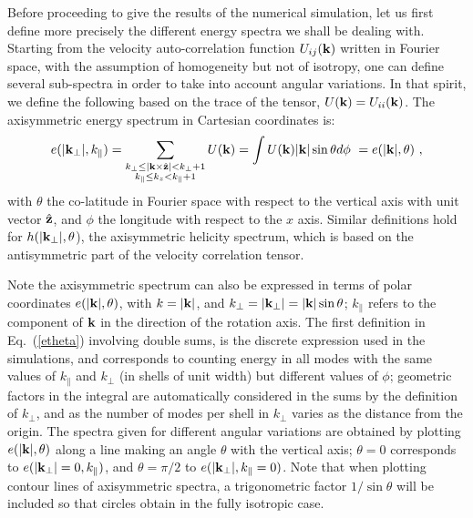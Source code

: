 \documentclass[aps,amsmath,amssymb,floatfix,showpacs]{revtex4}
\begin{document}
Before proceeding to give the results of the numerical simulation, let us first define more precisely the different energy spectra we shall be dealing with. Starting from the velocity auto-correlation function $U_{ij}({\bf k})$ written in Fourier space, with the assumption of homogeneity but not of isotropy, one can define several sub-spectra in order to take into account angular variations. In that spirit, we define the following based on the trace of the tensor, $U({\bf k})=U_{ii}({\bf k})$.
The axisymmetric energy spectrum in Cartesian coordinates is:
\begin{equation}
e(|{\bf k}_{\perp}|,k_{\parallel})=
    \sum_{\substack{
          k_{\perp}\le |{\bf k}\times \hat {\bf z}| < k_{\perp}+1 \\
          k_{\parallel}\le k_z < k_{\parallel}+1}} U({\bf k}) 
    = \int U({\bf k}) |{\bf k}| \sin \theta d \phi \  
    = e(|{\bf k}|, \theta) \ ,
\label{etheta} \end{equation}
with $\theta$ the co-latitude in Fourier space with respect to the vertical axis with unit vector $\hat {\bf z}$, and $\phi$ the longitude with respect to the $x$ axis. Similar definitions hold for $h(|{\bf k}_{\perp}|, \theta$), the axisymmetric helicity spectrum, which is based on the antisymmetric part of the velocity correlation tensor.

Note the axisymmetric spectrum can also be expressed in terms of polar coordinates $e(|{\bf k}|, \theta)$, with $k = |{\bf k}|$, and $k_{\perp}= |{\bf k}_\perp| = |{\bf k}| \sin \theta$; $k_{\parallel}$ refers to the component of ${\bf k}$ in the direction of the rotation axis. The first definition in Eq.~(\ref{etheta}) involving double sums, is the discrete expression used in the simulations, and corresponds to counting energy in all modes with the same values of $k_\parallel$ and $k_{\perp}$ (in shells of unit width) but different values of $\phi$; geometric factors in the integral are automatically considered in the sums by the definition of  $k_{\perp}$, and as the number of modes per shell in $k_{\perp}$ varies as the distance from the origin. The spectra given for different angular variations are obtained by plotting $e(|{\bf k}|, \theta)$ along a line making an angle $\theta$ with the vertical axis; $\theta=0$ corresponds to $e(|{\bf k}_{\perp}|=0,k_{\parallel})$, and $\theta=\pi/2$ to $e(|{\bf k}_{\perp}|,k_{\parallel}=0)$. Note that when plotting contour lines of axisymmetric spectra, a trigonometric factor $1/\sin \theta$ will be included so that circles obtain in the fully isotropic case. 
\end{document}
